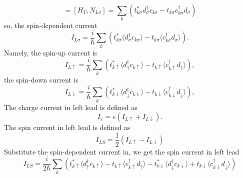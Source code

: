\documentclass[11pt,a4paper]{book}
\begin{document}
\begin{equation}
[H, N_{L\sigma}] = [H_{T}, N_{L\sigma}] =  \sum_{k}\left(t_{k \sigma}^{*} d_{\sigma}^{\dagger} c_{k \sigma} - t_{k \sigma} c_{k \sigma}^{\dagger} d_{\sigma} \right)
\end{equation}
so, the spin-dependent current
\begin{equation}
I_{L\sigma} = \frac{i}{\hbar} \sum_{k} \left( t_{k \sigma}^{*} \langle  d_{\sigma}^{\dagger} c_{k \sigma}\rangle - t_{k \sigma} \langle c_{k \sigma}^{\dagger} d_{\sigma} \rangle \right).
\end{equation}
Namely, the spin-up current is
\begin{equation}
I_{L\uparrow} = \frac{i}{\hbar} \sum_{k} \left( t_{k \uparrow}^{*} \langle  d_{\uparrow}^{\dagger} c_{k \uparrow}\rangle - t_{k \uparrow} \langle c_{k \uparrow}^{\dagger} d_{\uparrow} \rangle \right),
\end{equation}
the spin-down current is
\begin{equation}
I_{L\downarrow} = \frac{i}{\hbar} \sum_{k} \left( t_{k \downarrow}^{*} \langle  d_{\downarrow}^{\dagger} c_{k \downarrow}\rangle - t_{k \downarrow} \langle c_{k \downarrow}^{\dagger} d_{\downarrow} \rangle \right),
\end{equation}
The charge current in left lead is defined as
\begin{equation}
I_{e} = e(I_{L\uparrow} + I_{L\downarrow}).
\end{equation}
The spin current in left lead is defined as
\begin{equation}
I_{LS} = \frac{1}{2}(I_{L\uparrow} - I_{L\downarrow})
\end{equation}
Substitute the spin-dependent current in, we get the spin current in left lead
\begin{equation}
I_{LS} = \frac{i}{2\hbar} \sum_{k} \left( t_{k \uparrow}^{*} \langle  d_{\uparrow}^{\dagger} c_{k \uparrow}\rangle - t_{k \uparrow} \langle c_{k \uparrow}^{\dagger} d_{\uparrow} \rangle -  t_{k \downarrow}^{*} \langle  d_{\downarrow}^{\dagger} c_{k \downarrow}\rangle + t_{k \downarrow} \langle c_{k \downarrow}^{\dagger} d_{\downarrow} \rangle \right)
\end{equation}
\end{document}
